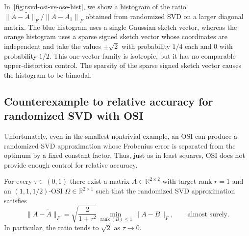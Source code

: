 \documentclass[onefignum,onetabnum]{siamart251216}
\newcommand{\R}{\mathbb{R}}
\newcommand{\norm}[1]{\left\lVert #1 \right\rVert}
\newcommand{\rank}{\operatorname{rank}}
\begin{document}
In~\cref{fig:rsvd-osi-vs-ose-hist}, we show a histogram of the ratio $\|A-\widetilde A\|_F / \norm{A-A_1}_F$ obtained from randomized SVD on a larger diagonal matrix.  The blue histogram uses a single Gaussian sketch vector, whereas the orange histogram uses a sparse signed sketch vector whose coordinates are independent and take the values $\pm\sqrt{2}$ with probability $1/4$ each and $0$ with probability $1/2$.  This one-vector family is isotropic, but it has no comparable upper-distortion control.  The sparsity of the sparse signed sketch vector causes the histogram to be bimodal. 

\subsection{Counterexample to relative accuracy for randomized SVD with OSI}
Unfortunately,  even in the smallest nontrivial example,  an OSI can produce a randomized SVD approximation whose Frobenius error is separated from the optimum by a fixed constant factor.  Thus, just as in least squares, OSI does not provide enough control for relative accuracy.

\begin{theorem}\label{thm:rsvd-counterexample}
For every $\tau\in(0,1)$ there exist a matrix $A\in\R^{2\times 2}$ with target rank $r=1$ and an $(1,1,1/2)$-OSI $\Omega\in\R^{2\times 1}$ such that the randomized SVD approximation satisfies
\[
\|A-\widetilde A\|_F
= 
\sqrt{\frac{2}{1+\tau^2}}\min_{\rank(B)\le 1}\|A-B\|_F, \qquad \text{almost surely.}
\]
In particular, the ratio tends to $\sqrt{2}$ as $\tau\to 0$.
\end{theorem}
\end{document}
